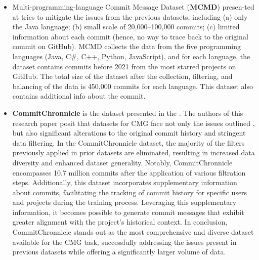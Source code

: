\begin{itemize}
    \item Multi-programming-language Commit Message Dataset (\textbf{MCMD}) presen-ted at{ }\cite{tao2021evaluation}  tries to mitigate the issues from the previous datasets, including (a) only the Java language; (b) small scale of 20,000–100,000 commits; (c) limited information about each commit (hence, no way to trace back to the original commit on GitHub). MCMD collects the data from the five programming languages (Java, C\#, C++, Python, JavaScript), and for each language, the dataset contains commits before 2021 from the most starred projects on GitHub. The total size of the dataset after the collection, filtering, and balancing of the data is  450,000 commits for each language. This dataset also contains additional info about the commit.

    \item \textbf{CommitChronnicle} is the dataset presented in the{ }\cite{eliseeva2023commit}. The authors of this research paper posit that datasets for CMG face not only the issues outlined{ }\cite{tao2021evaluation}, but also significant alterations to the original commit history and stringent data filtering. In the CommitChronnicle dataset, the majority of the filters previously applied in prior datasets are eliminated, resulting in increased data diversity and enhanced dataset generality. Notably, CommitChronnicle encompasses 10.7 million commits after the application of various filtration steps. Additionally, this dataset incorporates supplementary information about commits, facilitating the tracking of commit history for specific users and projects during the training process. Leveraging this supplementary information, it becomes possible to generate commit messages that exhibit greater alignment with the project's historical context. In conclusion, CommitChronnicle stands out as the most comprehensive and diverse dataset available for the CMG task, successfully addressing the issues present in previous datasets while offering a significantly larger volume of data.
\end{itemize}

